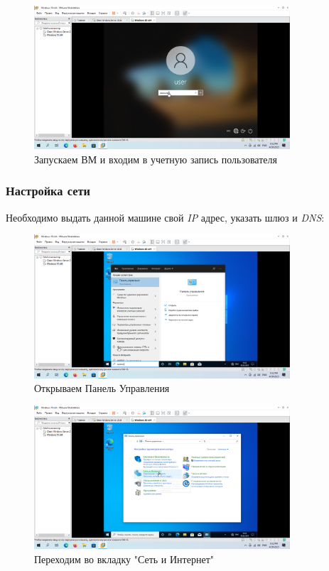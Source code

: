\documentclass[a4paper]{article}
\begin{document}
  \begin{figure}[H]
    \centering
    \includegraphics[width=0.85\textwidth]{Screenshot_81}
    \caption{Запускаем ВМ и входим в учетную запись пользователя}
    \label{img:81}
  \end{figure}

  \subsubsection{Настройка сети}

  Необходимо выдать данной машине свой \textit{IP} адрес, указать шлюз  и \textit{DNS}:

  \begin{figure}[H]
    \centering
    \includegraphics[width=0.85\textwidth]{Screenshot_82}
    \caption{Открываем Панель Управления}
    \label{img:82}
  \end{figure}

  \begin{figure}[H]
    \centering
    \includegraphics[width=0.85\textwidth]{Screenshot_83}
    \caption{Переходим во вкладку "Сеть и Интернет"}
    \label{img:83}
  \end{figure}
\end{document}
